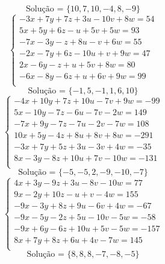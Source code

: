 \documentclass[12pt,oneside,a4paper]{article}
\begin{document}
\begin{equation*}
\text{Solução = }\{10,7,10,-4,8,-9\}
\end{equation*}
\vspace{\baselineskip}
\begin{equation*}
\begin{cases}
-3x+7y+7z+3u-10v+8w=54 \\
5x+5y+6z-u+5v+5w=93 \\
-7x-3y-z+8u-v+6w=55 \\
-2x-7y+6z-10u+v+9w=47 \\
2x-6y-z+u+5v+8w=80 \\
-6x-8y-6z+u+6v+9w=99 \\
\end{cases}
\end{equation*}
\begin{equation*}
\text{Solução = }\{-1,5,-1,1,6,10\}
\end{equation*}
\vspace{\baselineskip}
\begin{equation*}
\begin{cases}
-4x+10y+7z+10u-7v+9w=-99 \\
5x-10y-7z-6u-7v-2w=149 \\
-7x+9y-7z-7u-2v-7w=108 \\
10x+5y-4z+8u+8v+8w=-291 \\
-3x+7y+5z+3u-3v+4w=-35 \\
8x-3y-8z+10u+7v-10w=-131 \\
\end{cases}
\end{equation*}
\begin{equation*}
\text{Solução = }\{-5,-5,2,-9,-10,-7\}
\end{equation*}
\vspace{\baselineskip}
\begin{equation*}
\begin{cases}
4x+3y-9z+3u-8v-10w=77 \\
9x-2y+10z-u+v-4w=155 \\
-9x-3y+8z+9u-6v+4w=-67 \\
-9x-5y-2z+5u-10v-5w=-58 \\
-9x+6y-6z+10u+5v-5w=-157 \\
8x+7y+8z+6u+4v-7w=145 \\
\end{cases}
\end{equation*}
\begin{equation*}
\text{Solução = }\{8,8,8,-7,-8,-5\}
\end{equation*}
\end{document}
